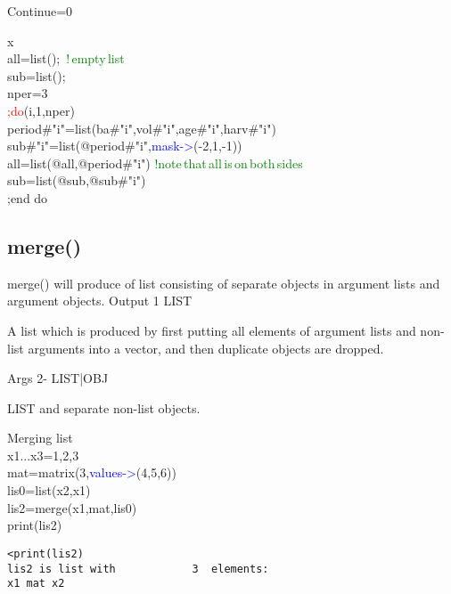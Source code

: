 Continue=0
\\
\begin{example}[list2ex]x\\
\label{list2ex}
all=\textcolor{VioletRed}{list}(); \,\textcolor{green}{!\,empty\,list}\\
sub=\textcolor{VioletRed}{list}();\\
nper=3\\
\textcolor{Red}{;do}(i,1,nper)\\
period\#"i"=\textcolor{VioletRed}{list}(ba\#"i",vol\#"i",age\#"i",harv\#"i")\\
sub\#"i"=\textcolor{VioletRed}{list}(@period\#"i",\textcolor{blue}{mask->}(-2,1,-1))\\
all=\textcolor{VioletRed}{list}(@all,@period\#"i") \textcolor{green}{!note\,that\,all\,is\,on\,both\,sides}\\
sub=\textcolor{VioletRed}{list}(@sub,@sub\#"i")\\
;end do
\end{example}
\subsection{\textcolor{VioletRed}{merge}()}
\label{merge}
\textcolor{VioletRed}{merge}() will produce of list consisting of separate objects
in argument lists and argument objects.
\vspace{0.3cm}
\hline
\vspace{0.3cm}
\noindent Output \tabto{3cm} 1 \tabto{5cm}  LIST \tabto{7cm}
\begin{changemargin}{3cm}{0cm}
\noindent A list which is produced by first putting all elements of
argument lists and non-list arguments into a vector, and then duplicate objects are dropped.
\end{changemargin}
\vspace{0.3cm}
\hline
\vspace{0.3cm}
\noindent Args \tabto{3cm} 2- \tabto{5cm}  LIST|OBJ \tabto{7cm}
\begin{changemargin}{3cm}{0cm}
\noindent  LIST and separate non-list objects.
\end {changemargin}
\hline
\vspace{0.2cm}
\begin{example}[mergex]Merging list\\
\label{mergex}
x1...x3=1,2,3\\
mat=\textcolor{VioletRed}{matrix}(3,\textcolor{blue}{values->}(4,5,6))\\
lis0=\textcolor{VioletRed}{list}(x2,x1)\\
lis2=\textcolor{VioletRed}{merge}(x1,mat,lis0)\\
\textcolor{VioletRed}{print}(lis2)
\color{Green}
\begin{verbatim}
<print(lis2)
lis2 is list with            3  elements:
x1 mat x2
\end{verbatim}
\color{Black}
\end{example}
